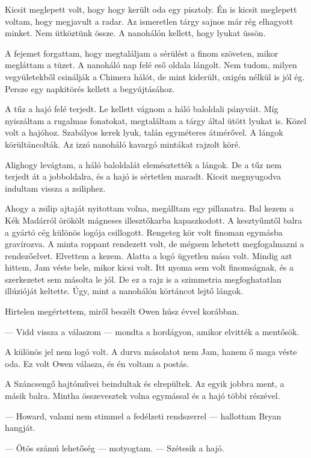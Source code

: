 \documentclass[10pt]{memoir}
\begin{document}
Kicsit meglepett volt, hogy hogy került oda egy pisztoly. Én is kicsit
meglepett voltam, hogy megjavult a radar. Az ismeretlen tárgy sajnos már rég
elhagyott minket. Nem ütköztünk össze. A nanohálón kellett, hogy lyukat üssön.

A fejemet forgattam, hogy megtaláljam a sérülést a finom szöveten, mikor
megláttam a tüzet. A nanoháló nap felé eső oldala lángolt. Nem tudom, milyen
vegyületekből csinálják a Chimera hálót, de mint kiderült, oxigén nélkül is jól
ég. Persze egy napkitörés kellett a begyújtásához.

A tűz a hajó felé terjedt. Le kellett vágnom a háló baloldali pányváit. Míg
nyiszáltam a rugalmas fonatokat, megtaláltam a tárgy által ütött lyukat is.
Közel volt a hajóhoz. Szabályos kerek lyuk, talán egyméteres átmérővel. A
lángok körültáncolták. Az izzó nanoháló kavargó mintákat rajzolt köré.

Alighogy levágtam, a háló baloldalát elemésztették a lángok. De a tűz nem
terjedt át a jobboldalra, és a hajó is sértetlen maradt. Kicsit megnyugodva
indultam vissza a zsiliphez.

Ahogy a zsilip ajtaját nyitottam volna, megálltam egy pillanatra. Bal kezem a
Kék Madárról örökölt mágneses illesztőkarba kapaszkodott. A kesztyűmtől balra a
gyártó cég különös logója csillogott. Rengeteg kör volt finoman egymásba
gravírozva. A minta roppant rendezett volt, de mégsem lehetett megfogalmazni a
rendezőelvet. Elvettem a kezem. Alatta a logó ügyetlen mása volt. Mindig azt
hittem, Jam véste bele, mikor kicsi volt. Itt nyoma sem volt finomságnak, és a
szerkezetet sem másolta le jól. De ez a rajz is a szimmetria megfoghatatlan
illúzióját keltette. Úgy, mint a nanohálón körtáncot lejtő lángok.

Hirtelen megértettem, miről beszélt Owen húsz évvel korábban.

--- Vidd vissza a válaszom --- mondta a hordágyon, amikor elvitték a mentősök.

A különös jel nem logó volt. A durva másolatot nem Jam, hanem ő maga véste oda.
Ez volt Owen válasza, és én voltam a postás.

A Száncsengő hajtóművei beindultak és elrepültek. Az egyik jobbra ment, a másik
balra. Mintha összevesztek volna egymással és a hajó többi részével.

--- Howard, valami nem stimmel a fedélzeti rendszerrel --- hallottam Bryan
hangját.

--- Ötös számú lehetőség --- motyogtam. --- Szétesik a hajó.
\end{document}
